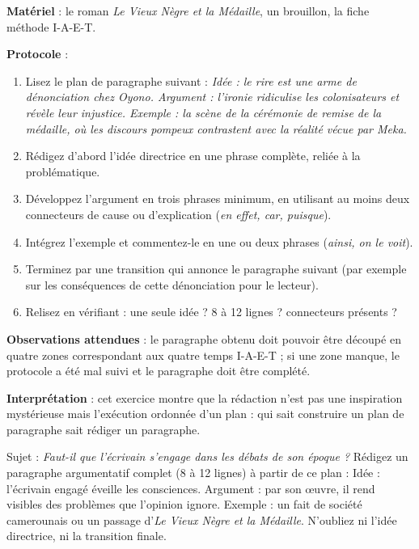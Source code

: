 \documentclass[11pt]{article}
\begin{document}
\begin{experience}
\textbf{Matériel} : le roman \emph{Le Vieux Nègre et la Médaille}, un brouillon, la fiche méthode I-A-E-T.
\par\smallskip
\textbf{Protocole} :
\begin{enumerate}
\item Lisez le plan de paragraphe suivant : \emph{Idée : le rire est une arme de dénonciation chez Oyono. Argument : l'ironie ridiculise les colonisateurs et révèle leur injustice. Exemple : la scène de la cérémonie de remise de la médaille, où les discours pompeux contrastent avec la réalité vécue par Meka.}
\item Rédigez d'abord l'idée directrice en une phrase complète, reliée à la problématique.
\item Développez l'argument en trois phrases minimum, en utilisant au moins deux connecteurs de cause ou d'explication (\emph{en effet, car, puisque}).
\item Intégrez l'exemple et commentez-le en une ou deux phrases (\emph{ainsi, on le voit}).
\item Terminez par une transition qui annonce le paragraphe suivant (par exemple sur les conséquences de cette dénonciation pour le lecteur).
\item Relisez en vérifiant : une seule idée ? 8 à 12 lignes ? connecteurs présents ?
\end{enumerate}
\textbf{Observations attendues} : le paragraphe obtenu doit pouvoir être découpé en quatre zones correspondant aux quatre temps I-A-E-T ; si une zone manque, le protocole a été mal suivi et le paragraphe doit être complété.
\par\smallskip
\textbf{Interprétation} : cet exercice montre que la rédaction n'est pas une inspiration mystérieuse mais l'exécution ordonnée d'un plan : qui sait construire un plan de paragraphe sait rédiger un paragraphe.
\end{experience}

\begin{exercice}
Sujet : \emph{Faut-il que l'écrivain s'engage dans les débats de son époque ?} Rédigez un paragraphe argumentatif complet (8 à 12 lignes) à partir de ce plan : Idée : l'écrivain engagé éveille les consciences. Argument : par son œuvre, il rend visibles des problèmes que l'opinion ignore. Exemple : un fait de société camerounais ou un passage d'\emph{Le Vieux Nègre et la Médaille}. N'oubliez ni l'idée directrice, ni la transition finale.
\end{exercice}
\end{document}
